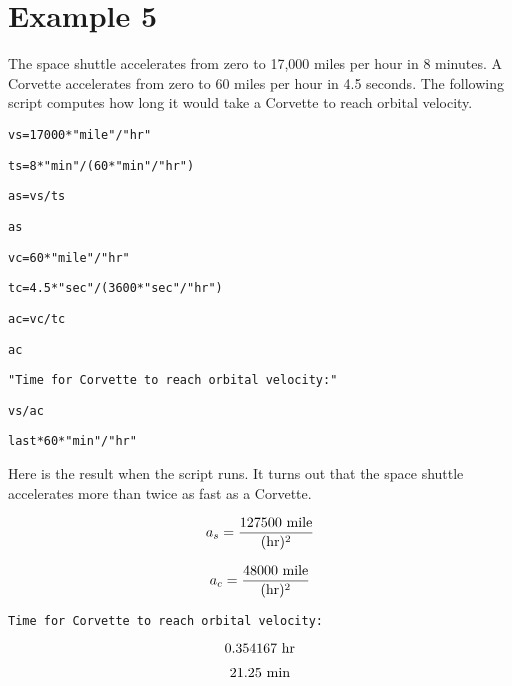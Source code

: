 
\newpage

\section*{Example 5}

The space shuttle accelerates from zero to 17{,}000 miles per hour
in 8 minutes.
A Corvette accelerates from zero to 60 miles per hour in 4.5 seconds.
The following script computes how long it would take a Corvette to
reach orbital velocity.

\medskip
\verb$vs=17000*"mile"/"hr"$

\verb$ts=8*"min"/(60*"min"/"hr")$

\verb$as=vs/ts$

\verb$as$

\verb$vc=60*"mile"/"hr"$

\verb$tc=4.5*"sec"/(3600*"sec"/"hr")$

\verb$ac=vc/tc$

\verb$ac$

\verb$"Time for Corvette to reach orbital velocity:"$

\verb$vs/ac$

\verb$last*60*"min"/"hr"$

\medskip
\noindent
Here is the result when the script runs.
It turns out that the space shuttle accelerates more than twice as fast as a
Corvette.

\medskip
$$a_s={\hbox{127500 mile}\over(\hbox{hr})^2}$$

$$a_c={\hbox{48000 mile}\over(\hbox{hr})^2}$$

\verb$Time for Corvette to reach orbital velocity:$

$$\hbox{0.354167 hr}$$

$$\hbox{21.25 min}$$

